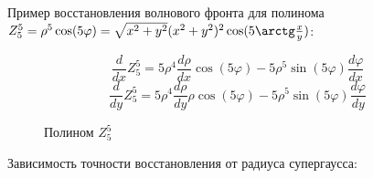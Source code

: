 \documentclass[oneside, final, 14pt]{article}
\begin{document}
\begin{center}
Пример восстановления волнового фронта для полинома $Z_5^5 = \rho^5 \cos(5\varphi) = 
\sqrt{x^2 + y^2}(x^2 + y^2)^2\cos(5 \arctg\frac{x}{y} )$:
\end{center}
$$
\frac{d}{dx} Z_5^5 = 5 \rho^4 \frac{d\rho}{dx}  \cos(5 \varphi) - 5\rho^5 \sin(5 \varphi) \frac{d\varphi}{dx} 
$$
$$
\frac{d}{dy} Z_5^5 = 5 \rho^4 \frac{d\rho}{dy} \rho \cos(5 \varphi) - 5\rho^5 \sin(5 \varphi) \frac{d\varphi}{dy} 
$$
\begin{figure}[h]
	\caption{Полином $Z_5^5$}
	\label{fig:image}
\end{figure}

Зависимость точности восстановления от радиуса супергаусса:
\begin{figure}
	\begin{minipage}[h]{0.49\linewidth}
	\end{minipage}
	\hfill
	\begin{minipage}[h]{0.49\linewidth}
	\end{minipage}
	
	\label{ris:image1}
\end{figure}
\end{document}
